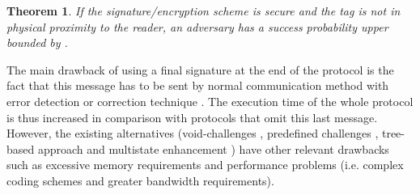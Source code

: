 \documentclass{article}
\newtheorem{theorem}{Theorem}\newtheorem{proposition}[theorem]{Proposition}
\begin{document}
\begin{theorem}\label{th::mafiafraud}
If the signature/encryption scheme is secure and the tag is not in physical proximity to the reader, an adversary has a success probability upper bounded by  \cite{KimAKSP-2008-icisc,brands94}.
\end{theorem}


The main drawback of using a final signature at the end of the protocol is the fact that this message has to be sent by normal communication method with error detection or correction technique \cite{KimA-2009-cans}. The execution time of the whole protocol is thus increased in comparison with protocols that omit this last message.   However, the existing alternatives (void-challenges \cite{munilla2}, predefined challenges \cite{KimA-2009-cans}, tree-based approach \cite{AvoineT-2009-isc} and multistate enhancement \cite{AvoineFM-2009-indocrypt}) have other relevant drawbacks such as excessive memory requirements and performance problems (i.e. complex coding schemes and greater bandwidth requirements).
\end{document}
